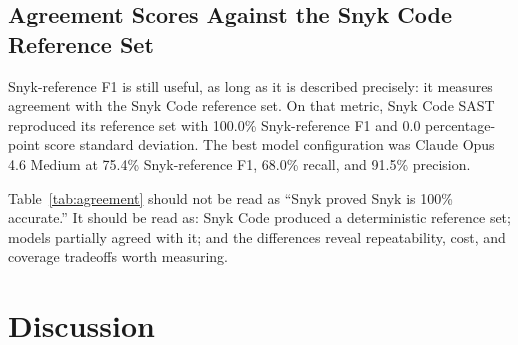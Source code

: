 \documentclass[11pt]{article}
\begin{document}
\subsection{Agreement Scores Against the Snyk Code Reference Set}

Snyk-reference F1 is still useful, as long as it is described precisely: it measures agreement with the Snyk Code reference set. On that metric, Snyk Code SAST reproduced its reference set with 100.0\% Snyk-reference F1 and 0.0 percentage-point score standard deviation. The best model configuration was Claude Opus 4.6 Medium at 75.4\% Snyk-reference F1, 68.0\% recall, and 91.5\% precision.

\begin{table}[htbp]
\centering
\caption{Agreement scores, runtime, token use, and estimated model-session cost.}
\label{tab:agreement}
\small
{}
\end{table}

Table~\ref{tab:agreement} should not be read as ``Snyk proved Snyk is 100\% accurate.'' It should be read as: Snyk Code produced a deterministic reference set; models partially agreed with it; and the differences reveal repeatability, cost, and coverage tradeoffs worth measuring.

\section{Discussion}
\end{document}
